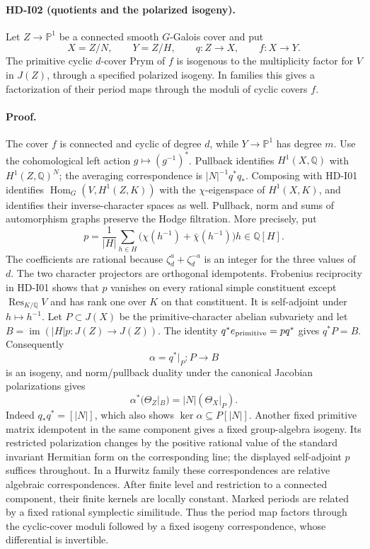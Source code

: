\paragraph{HD-I02 (quotients and the polarized isogeny).}
Let $Z\to\mathbb P^1$ be a connected smooth $G$-Galois cover and put
\[
X=Z/N,\qquad Y=Z/H,\qquad q:Z\to X,\qquad f:X\to Y.
\]
The primitive cyclic $d$-cover Prym of $f$ is isogenous to the
multiplicity factor for $V$ in $J(Z)$, through a specified polarized
isogeny. In families this gives a factorization of their period maps
through the moduli of cyclic covers $f$.

\paragraph{Proof.}
The cover $f$ is connected and cyclic of degree $d$, while
$Y\to\mathbb P^1$ has degree $m$. Use the cohomological left action
$g\mapsto(g^{-1})^*$. Pullback identifies
$H^1(X,\mathbb Q)$ with $H^1(Z,\mathbb Q)^N$; the averaging
correspondence is $|N|^{-1}q^*q_*$. Composing with HD-I01 identifies
$\operatorname{Hom}_G(V,H^1(Z,K))$ with the $\chi$-eigenspace of
$H^1(X,K)$, and identifies their inverse-character spaces as well.
Pullback, norm and sums of automorphism graphs preserve the Hodge
filtration.
More precisely, put
\[
p=\frac1{|H|}\sum_{h\in H}
\bigl(\chi(h^{-1})+\bar\chi(h^{-1})\bigr)h\in\mathbb Q[H].
\]
The coefficients are rational because $\zeta_d^a+\zeta_d^{-a}$ is an
integer for the three values of $d$. The two character projectors are
orthogonal idempotents. Frobenius reciprocity in HD-I01 shows that $p$
vanishes on every rational simple constituent except
$\operatorname{Res}_{K/\mathbb Q}V$ and has rank one over $K$ on that
constituent. It is self-adjoint under $h\mapsto h^{-1}$.
Let $P\subset J(X)$ be the primitive-character abelian subvariety and
let $B=\operatorname{im}(|H|p:J(Z)\to J(Z))$. The identity
$q^*e_{\rm primitive}=pq^*$ gives $q^*P=B$. Consequently
\[
\alpha=q^*|_P:P\longrightarrow B
\]
is an isogeny, and norm/pullback duality under the canonical Jacobian
polarizations gives
\[
\alpha^*(\Theta_Z|_B)=|N|(\Theta_X|_P).
\]
Indeed $q_*q^*=[|N|]$, which also shows
$\ker\alpha\subseteq P[|N|]$.
Another fixed primitive matrix idempotent in the same component gives
a fixed group-algebra isogeny. Its restricted polarization changes
by the positive rational value of the standard invariant Hermitian
form on the corresponding line; the displayed self-adjoint $p$ suffices
throughout.
In a Hurwitz family these correspondences are relative algebraic
correspondences. After finite level and restriction to a connected
component, their finite kernels are locally constant. Marked periods
are related by a fixed rational symplectic similitude. Thus the period
map factors through the cyclic-cover moduli followed by a fixed
isogeny correspondence, whose differential is invertible.

